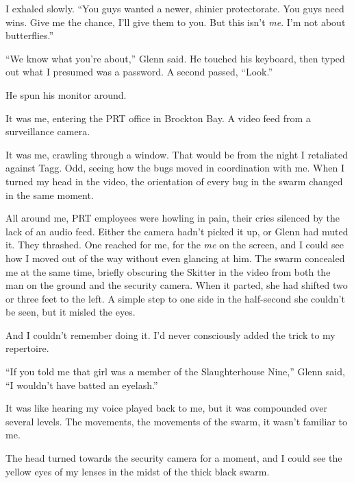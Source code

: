 I exhaled slowly.  ``You guys wanted a newer, shinier protectorate.  You guys need wins.  Give me the chance, I'll give them to you.  But this isn't \emph{me}.  I'm not about butterflies.''



``We know what you're about,'' Glenn said.  He touched his keyboard, then typed out what I presumed was a password.  A second passed, ``Look.''



He spun his monitor around.



It was me, entering the PRT office in Brockton Bay.  A video feed from a surveillance camera.



It was me, crawling through a window.  That would be from the night I retaliated against Tagg.  Odd, seeing how the bugs moved in coordination with me.  When I turned my head in the video, the orientation of every bug in the swarm changed in the same moment.



All around me, PRT employees were howling in pain, their cries silenced by the lack of an audio feed.  Either the camera hadn't picked it up, or Glenn had muted it.  They thrashed.  One reached for me, for the \emph{me} on the screen, and I could see how I moved out of the way without even glancing at him.  The swarm concealed me at the same time, briefly obscuring the Skitter in the video from both the man on the ground and the security camera.  When it parted, she had shifted two or three feet to the left.  A simple step to one side in the half-second she couldn't be seen, but it misled the eyes.



And I couldn't remember doing it.  I'd never consciously added the trick to my repertoire.



``If you told me that girl was a member of the Slaughterhouse Nine,'' Glenn said, ``I wouldn't have batted an eyelash.''



It was like hearing my voice played back to me, but it was compounded over several levels.  The movements, the movements of the swarm, it wasn't familiar to me.



The head turned towards the security camera for a moment, and I could see the yellow eyes of my lenses in the midst of the thick black swarm.



